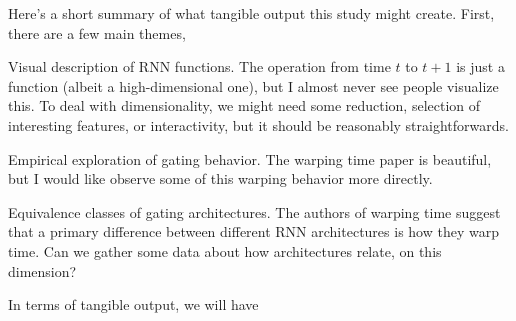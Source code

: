 \documentclass{article}
\begin{document}
 Here's a short summary of what tangible output this study might create. First,
 there are a few main themes,
\begin{itemize*}
  \item Visual description of RNN functions. The operation from time $t$ to $t +
    1$ is just a function (albeit a high-dimensional one), but I almost never
    see people visualize this. To deal with dimensionality, we might need some
    reduction, selection of interesting features, or interactivity, but it
    should be reasonably straightforwards.
  \item Empirical exploration of gating behavior. The warping time paper is
    beautiful, but I would like observe some of this warping behavior more
    directly.
  \item Equivalence classes of gating architectures. The authors of warping time
    suggest that a primary difference between different RNN architectures is how
    they warp time. Can we gather some data about how architectures relate, on
    this dimension?
\end{itemize*}

In terms of tangible output, we will have
\end{document}
